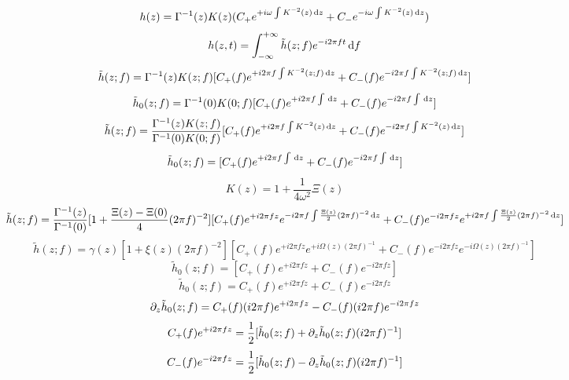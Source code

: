 \begin{equation}
    h(z)=\Gamma^{-1}(z)K(z)(C_+e^{+i\omega\int K^{-2}(z)\,\mathrm{d} z}+C_-e^{-i\omega\int K^{-2}(z)\,\mathrm{d} z})
\end{equation}
\begin{equation}
    h(z,t)=\int_{-\infty}^{+\infty}\tilde{h}(z;f)e^{-i2\pi f t}\,\mathrm{d} f
\end{equation}
\begin{equation}
    \tilde{h}(z;f)=\Gamma^{-1}(z)K(z;f)[C_+(f)e^{+i2\pi f\int K^{-2}(z;f)\,\mathrm{d} z}+C_-(f)e^{-i2\pi f\int K^{-2}(z;f)\,\mathrm{d} z}]
\end{equation}
\begin{equation}
    \tilde{h}_0(z;f)=\Gamma^{-1}(0)K(0;f)[C_+(f)e^{+i2\pi f\int\,\mathrm{d} z}+C_-(f)e^{-i2\pi f\int\,\mathrm{d} z}]
\end{equation}
\begin{equation}
    \tilde{h}(z;f)=\frac{\Gamma^{-1}(z)K(z;f)}{\Gamma^{-1}(0)K(0;f)}[C_+(f)e^{+i2\pi f\int K^{-2}(z)\,\mathrm{d} z}+C_-(f)e^{-i2\pi f\int K^{-2}(z)\,\mathrm{d} z}]
\end{equation}
\begin{equation}
    \tilde{h}_0(z;f)=[C_+(f)e^{+i2\pi f\int\,\mathrm{d} z}+C_-(f)e^{-i2\pi f\int\,\mathrm{d} z}]
\end{equation}
\begin{equation}
    K(z)=1+\frac{1}{4\omega^2}\Xi(z)
\end{equation}
\begin{equation}
    \tilde{h}(z;f)=\frac{\Gamma^{-1}(z)}{\Gamma^{-1}(0)}[1+\frac{\Xi(z)-\Xi(0)}{4}(2\pi f)^{-2}][C_+(f)e^{+i2\pi fz}e^{-i2\pi f\int\frac{\Xi(z)}{2}(2\pi f)^{-2}\,\mathrm{d} z}+C_-(f)e^{-i2\pi fz}e^{+i2\pi f\int\frac{\Xi(z)}{2}(2\pi f)^{-2}\,\mathrm{d} z}]
\end{equation}
\begin{equation}
    \tilde{h}(z;f)=\gamma(z)[1+\xi(z)(2\pi f)^{-2}][C_+(f)e^{+i2\pi fz}e^{+i\Omega(z)(2\pi f)^{-1}}+C_-(f)e^{-i2\pi fz}e^{-i\Omega(z)(2\pi f)^{-1}}]
\end{equation}
\begin{equation}
    \tilde{h}_0(z;f)=[C_+(f)e^{+i2\pi fz}+C_-(f)e^{-i2\pi fz}]
\end{equation}
\begin{equation}
    \tilde{h}_0(z;f)=C_+(f)e^{+i2\pi fz}+C_-(f)e^{-i2\pi fz}
\end{equation}
\begin{equation}
    \partial_z\tilde{h}_0(z;f)=C_+(f)(i2\pi f)e^{+i2\pi fz}-C_-(f)(i2\pi f)e^{-i2\pi fz}
\end{equation}
\begin{equation}
    C_+(f)e^{+i2\pi fz}=\frac{1}{2}[\tilde{h}_0(z;f)+\partial_z\tilde{h}_0(z;f)(i2\pi f)^{-1}]
\end{equation}
\begin{equation}
    C_-(f)e^{-i2\pi fz}=\frac{1}{2}[\tilde{h}_0(z;f)-\partial_z\tilde{h}_0(z;f)(i2\pi f)^{-1}]
\end{equation}


